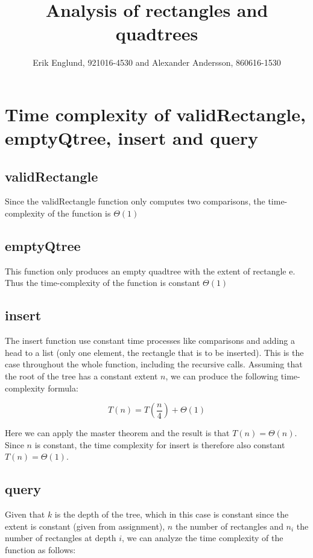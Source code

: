 \documentclass[12pt, a4paper]{article}
\title{Analysis of rectangles and quadtrees}
\author{Erik Englund, 921016-4530 and Alexander Andersson, 860616-1530}
\begin{document}
\maketitle

\section{Time complexity of validRectangle, emptyQtree, insert and query}

\subsection{validRectangle}

Since the validRectangle function only computes two comparisons, the time-complexity of the function is 
$\Theta(1)$




\subsection{emptyQtree}

This function only produces an empty quadtree with the extent of rectangle e. Thus the time-complexity of the function is constant $\Theta(1)$



\subsection{insert}

The insert function use constant time processes like comparisons and adding a head to a list (only one element, the rectangle that is to be inserted). This is the case throughout the whole function, including the recursive calls. Assuming that the root of the tree has a constant extent $n$, we can produce the following time-complexity formula:

$$T(n)=T\left(\frac{n}{4}\right)+\Theta(1)$$

Here we can apply the master theorem and the result is that $T(n)=\Theta(n)$. Since $n$ is constant, the time complexity for insert is therefore also constant $T(n) = \Theta(1)$.



\subsection{query}


Given that $k$ is the depth of the tree, which in this case is constant since the extent is constant (given from assignment), $n$ the number of rectangles and $n_i$ the number of rectangles at depth $i$, we can analyze the time complexity of the function as follows:
\end{document}
